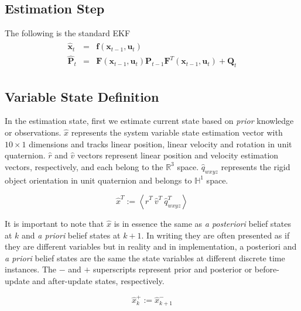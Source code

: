 \documentclass[letterpaper, 10 pt, conference]{ieeeconf}  %
\newcommand{\transpose}[1]{\ensuremath{#1^{\scriptscriptstyle T}}}
\begin{document}
\subsection{Estimation Step}
The following is the standard EKF
\begin{equation}
\begin{split}\begin{array}{rcl}
        \hat{\mathbf{x}}_t &=& \mathbf{f}(\mathbf{x}_{t-1}, \mathbf{u}_t) \\
        \hat{\mathbf{P}}_t &=& \mathbf{F}(\mathbf{x}_{t-1}, \mathbf{u}_t)\mathbf{P}_{t-1}\mathbf{F}^T(\mathbf{x}_{t-1}, \mathbf{u}_t) + \mathbf{Q}_t
        \end{array}\end{split}
\end{equation}


\subsection{Variable State Definition}

In the estimation state, first we estimate current state based on \textit{prior}
knowledge or observations.
\(\hat{x}\) represents the system variable state estimation vector with
\(10 \times 1\) dimensions and tracks linear position, linear velocity and
rotation in unit quaternion. \(\hat{r}\) and \(\hat{v}\) vectors represent
linear position and velocity estimation vectors, respectively, and each belong
to the \(\mathbb{R}^{3}\) space. \(\hat{q}_{wxyz}\) represents the rigid object
orientation in unit quaternion and belongs to \(\mathbb{H}^{1}\) space.

\begin{equation}
  \transpose{\hat{x}}:= \left<\transpose{\hat{r}}~\transpose{\hat{v}}~\transpose{\hat{q}_{wxyz}} \right>
\end{equation}


It is important to note that \(\hat{x}\) is in essence the same as
\textit{a posteriori} belief states at \(k\) and \textit{a priori}
belief states at \(k+1\). In writing they are often presented as if they are
different variables but in reality and in implementation, {a posteriori} and
\textit{a priori} belief states are the same the state variables at
different discrete time instances. The \(-\) and \(+\) superscripts represent
prior and posterior or before-update and after-update states, respectively.

\begin{equation}
        \hat{x}_{k}^{+} := \hat{x}_{k+1}^{-}
\end{equation}
\end{document}
